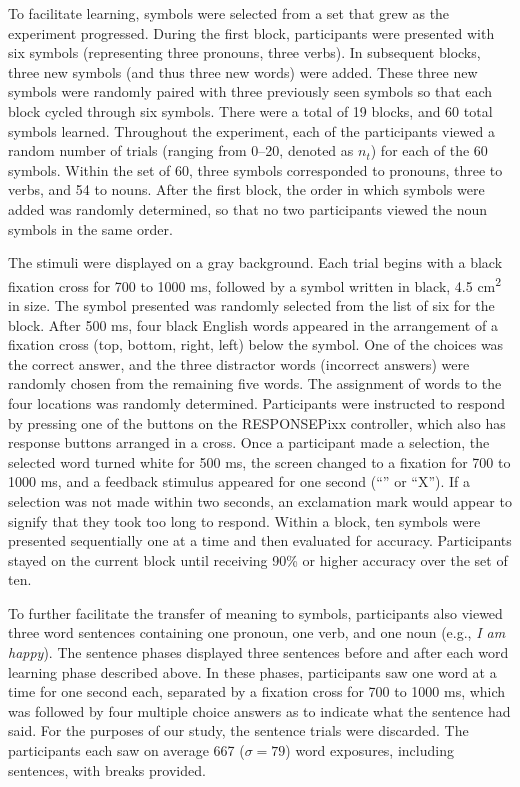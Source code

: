 To facilitate learning, symbols were selected from a set that grew as the experiment progressed. During the first block, participants were presented with six symbols (representing three pronouns, three verbs). In subsequent blocks, three new symbols (and thus three new words) were added. These three new symbols were randomly paired with three previously seen symbols so that each block cycled through six symbols. There were a total of 19 blocks, and 60 total symbols learned. Throughout the experiment, each of the participants viewed a random number of trials (ranging from 0--20, denoted as $n_t$) for each of the 60 symbols. Within the set of 60, three symbols corresponded to pronouns, three to verbs, and 54 to nouns. After the first block, the order in which symbols were added was randomly determined, so that no two participants viewed the noun symbols in the same order.
  
The stimuli were displayed on a gray background.  Each trial begins with a black fixation cross for 700 to 1000 ms, followed by a symbol written in black, 4.5 cm\textsuperscript{2} in size. The symbol presented was randomly selected from the list of six for the block. After 500 ms, four black English words appeared in the arrangement of a fixation cross (top, bottom, right, left) below the symbol. One of the choices was the correct answer, and the three distractor words (incorrect answers) were randomly chosen from the remaining five words. The assignment of words to the four locations was randomly determined. Participants were instructed to respond by pressing one of the buttons on the RESPONSEPixx controller, which also has response buttons arranged in a cross. Once a participant made a selection, the selected word turned white for 500 ms, the screen changed to a fixation for 700 to 1000 ms, and a feedback stimulus appeared for one second (``\CheckmarkBold'' or ``X''). If a selection was not made within two seconds, an exclamation mark would appear to signify that they took too long to respond. Within a block, ten symbols were presented sequentially one at a time and then evaluated for accuracy. Participants stayed on the current block until receiving 90\% or higher accuracy over the set of ten.
  
To further facilitate the transfer of meaning to symbols, participants also viewed three word sentences containing one pronoun, one verb, and one noun (e.g., \emph{I am happy}). The sentence phases displayed three sentences before and after each word learning phase described above. In these phases, participants saw one word at a time for one second each, separated by a fixation cross for 700 to 1000 ms, which was followed by four multiple choice answers as to indicate what the sentence had said. For the purposes of our study, the sentence trials were discarded. The participants each saw on average 667 ($\sigma = 79$) word exposures, including sentences, with breaks provided.

